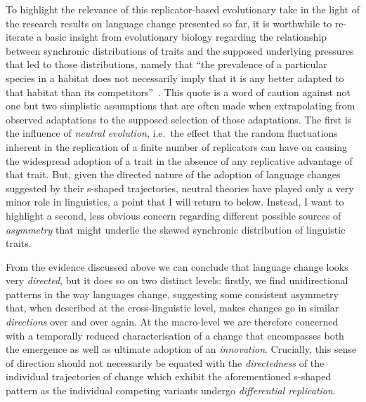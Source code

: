 To highlight the relevance of this replicator-based evolutionary take in the light of the research results on language change presented so far, it is worthwhile to re-iterate a basic insight from evolutionary biology regarding the relationship between synchronic distributions of traits and the supposed underlying pressures that led to those distributions, namely that ``the prevalence of a particular species in a habitat does not necessarily imply that it is any better adapted to that habitat than its competitors''~\citep[p.2]{Blythe2012copying}.
This quote is a word of caution against not one but two simplistic assumptions that are often made when extrapolating from observed adaptations to the supposed selection of those adaptations. The first is the influence of \emph{neutral evolution}, 
i.e.~the effect that the random fluctuations inherent in the replication of a finite number of replicators can have on causing the widespread adoption of a trait in the absence of any replicative advantage of that trait. But, given the directed nature of the adoption of language changes suggested by their s-shaped trajectories, neutral theories have played only a very minor role in linguistics, a point that I will return to below.
Instead, I want to highlight a second, less obvious concern regarding different possible sources of \emph{asymmetry} that might underlie the skewed synchronic distribution of linguistic traits.

From the evidence discussed above we can conclude that language change looks very \emph{directed}, but it does so on two distinct levels: firstly, we find unidirectional patterns in the way languages change, suggesting some consistent asymmetry that, when described at the cross-linguistic level, makes changes go in similar \emph{directions} over and over again. At the macro-level we are therefore concerned with a temporally reduced characterisation of a change that encompasses both the emergence as well as ultimate adoption of an \emph{innovation}.
Crucially, this sense of direction should not necessarily be equated with the \emph{directedness} of the individual trajectories of change which exhibit the aforementioned s-shaped pattern as the individual competing variants undergo \emph{differential replication}. %

